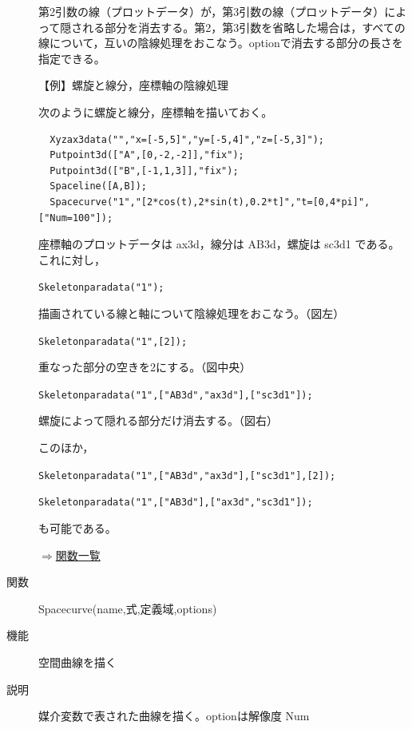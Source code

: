 \documentclass[papersize,a4paper,12pt,uplatex]{jsarticle}
\begin{document}
\begin{description}
第2引数の線（プロットデータ）が，第3引数の線（プロットデータ）によって隠される部分を消去する。第2，第3引数を省略した場合は，すべての線について，互いの陰線処理をおこなう。optionで消去する部分の長さを指定できる。

\vspace{\baselineskip}
【例】螺旋と線分，座標軸の陰線処理

次のように螺旋と線分，座標軸を描いておく。
\begin{verbatim}
  Xyzax3data("","x=[-5,5]","y=[-5,4]","z=[-5,3]");
  Putpoint3d(["A",[0,-2,-2]],"fix");
  Putpoint3d(["B",[-1,1,3]],"fix");
  Spaceline([A,B]);
  Spacecurve("1","[2*cos(t),2*sin(t),0.2*t]","t=[0,4*pi]",["Num=100"]);
\end{verbatim}
座標軸のプロットデータは ax3d，線分は AB3d，螺旋は sc3d1 である。これに対し，

\hspace{10mm} \verb|Skeletonparadata("1");|

 描画されている線と軸について陰線処理をおこなう。（図左）

\hspace{10mm} \verb|Skeletonparadata("1",[2]);|

 重なった部分の空きを2にする。（図中央）
 
\hspace{10mm} \verb|Skeletonparadata("1",["AB3d","ax3d"],["sc3d1"]);|
  
螺旋によって隠れる部分だけ消去する。（図右）

\begin{center}     
  \end{center}

このほか，

\hspace{10mm} \verb|Skeletonparadata("1",["AB3d","ax3d"],["sc3d1"],[2]);|

\hspace{10mm} \verb|Skeletonparadata("1",["AB3d"],["ax3d","sc3d1"]);|

も可能である。

\begin{flushright} \hyperlink{functionlist}{$\Rightarrow$関数一覧}\end{flushright}
\vspace{\baselineskip}

\hypertarget{spacecurve}{}
\item[関数]  Spacecurve(name,式,定義域,options)
\item[機能]  空間曲線を描く
\item[説明]  媒介変数で表された曲線を描く。optionは解像度 Num


\end{description}
\end{document}
